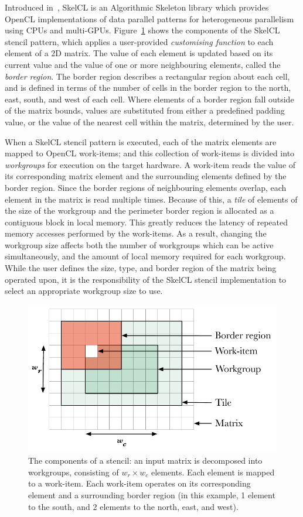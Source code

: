 \documentclass[preprint,nonatbib,10pt]{sigplanconf}
\begin{document}
Introduced in~\cite{Steuwer2011}, SkelCL is an Algorithmic Skeleton
library which provides OpenCL implementations of data parallel
patterns for heterogeneous parallelism using CPUs and
multi-GPUs. Figure~\ref{fig:stencil-shape} shows the components of the
SkelCL stencil pattern, which applies a user-provided
\emph{customising function} to each element of a 2D matrix. The value
of each element is updated based on its current value and the value of
one or more neighbouring elements, called the \emph{border
  region}. The border region describes a rectangular region about each
cell, and is defined in terms of the number of cells in the border
region to the north, east, south, and west of each cell. Where
elements of a border region fall outside of the matrix bounds, values
are substituted from either a predefined padding value, or the value
of the nearest cell within the matrix, determined by the user.

When a SkelCL stencil pattern is executed, each of the matrix elements
are mapped to OpenCL work-items; and this collection of work-items is
divided into \emph{workgroups} for execution on the target hardware. A
work-item reads the value of its corresponding matrix element and the
surrounding elements defined by the border region. Since the border
regions of neighbouring elements overlap, each element in the matrix
is read multiple times. Because of this, a \emph{tile} of elements of
the size of the workgroup and the perimeter border region is allocated
as a contiguous block in local memory. This greatly reduces the
latency of repeated memory accesses performed by the work-items. As a
result, changing the workgroup size affects both the number of
workgroups which can be active simultaneously, and the amount of local
memory required for each workgroup. While the user defines the size,
type, and border region of the matrix being operated upon, it is the
responsibility of the SkelCL stencil implementation to select an
appropriate workgroup size to use.

\begin{figure}
\centering
\includegraphics[width=.75\columnwidth]{stencil}
\caption[Stencil border region]{%
  The components of a stencil: an input matrix is decomposed into
  workgroups, consisting of $w_r \times w_c$ elements. Each element is
  mapped to a work-item. Each work-item operates on its corresponding
  element and a surrounding border region (in this example, 1 element
  to the south, and 2 elements to the north, east, and west).
  \vspace{-1em}
}
\label{fig:stencil-shape}
\end{figure}
\end{document}
